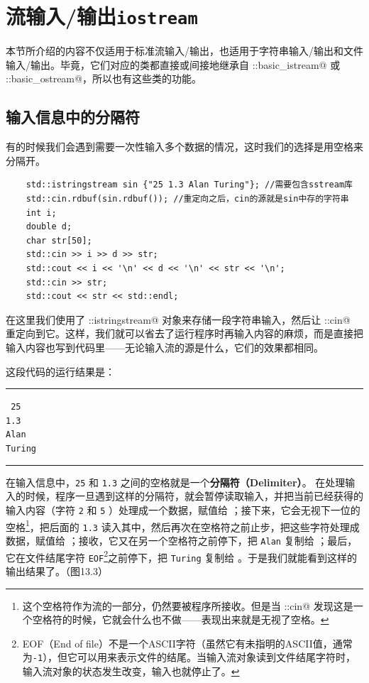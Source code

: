 \section{流输入/输出\texttt{iostream}}
本节所介绍的内容不仅适用于标准流输入/输出，也适用于字符串输入/输出和文件输入/输出。毕竟，它们对应的类都直接或间接地继承自 \lstinline@std::basic_istream@ 或 \lstinline@std::basic_ostream@，所以也有这些类的功能。\par
\subsection*{输入信息中的分隔符}
有的时候我们会遇到需要一次性输入多个数据的情况，这时我们的选择是用空格来分隔开。
\begin{lstlisting}
    std::istringstream sin {"25 1.3 Alan Turing"}; //需要包含sstream库
    std::cin.rdbuf(sin.rdbuf()); //重定向之后，cin的源就是sin中存的字符串
    int i;
    double d;
    char str[50];
    std::cin >> i >> d >> str;
    std::cout << i << '\n' << d << '\n' << str << '\n';
    std::cin >> str;
    std::cout << str << std::endl;
\end{lstlisting}
在这里我们使用了 \lstinline@std::istringstream@ 对象来存储一段字符串输入，然后让 \lstinline@std::cin@ 重定向到它。这样，我们就可以省去了运行程序时再输入内容的麻烦，而是直接把输入内容也写到代码里——无论输入流的源是什么，它们的效果都相同。\par
这段代码的运行结果是：\\\noindent\rule{\linewidth}{.2pt}\texttt{
25\\
1.3\\
Alan\\
Turing
}\\\noindent\rule{\linewidth}{.2pt}\par
在输入信息中，\texttt{25} 和 \texttt{1.3} 之间的空格就是一个\textbf{分隔符（Delimiter）}。 在处理输入的时候，程序一旦遇到这样的分隔符，就会暂停读取输入，并把当前已经获得的输入内容（字符 \texttt{2} 和 \texttt{5} ）处理成一个数据，赋值给 \lstinline@i@；接下来，它会无视下一位的空格\footnote{这个空格符作为流的一部分，仍然要被程序所接收。但是当 \lstinline@std::cin@ 发现这是一个空格符的时候，它就会什么也不做——表现出来就是无视了空格。}，把后面的 \texttt{1.3} 读入其中，然后再次在空格符之前止步，把这些字符处理成数据，赋值给 \lstinline@d@；接收，它又在另一个空格符之前停下，把 \texttt{Alan} 复制给 \lstinline@str@；最后，它在文件结尾字符 \texttt{EOF}\footnote{EOF（End of file）不是一个ASCII字符（虽然它有未指明的ASCII值，通常为\texttt{-1}），但它可以用来表示文件的结尾。当输入流对象读到文件结尾字符时，输入流对象的状态发生改变，输入也就停止了。}之前停下，把 \texttt{Turing} 复制给 \lstinline@str@。于是我们就能看到这样的输出结果了。（图13.3）\par
